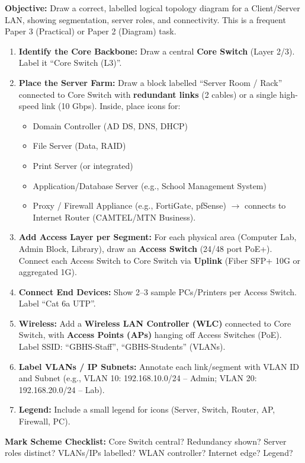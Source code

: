 \documentclass[11pt]{article}
\begin{document}
\begin{methode}
\textbf{Objective:} Draw a correct, labelled logical topology diagram for a Client/Server LAN, showing segmentation, server roles, and connectivity. This is a frequent Paper 3 (Practical) or Paper 2 (Diagram) task.

\begin{enumerate}
    \item \textbf{Identify the Core Backbone:} Draw a central \textbf{Core Switch} (Layer 2/3). Label it ``Core Switch (L3)''.
    \item \textbf{Place the Server Farm:} Draw a block labelled ``Server Room / Rack'' connected to Core Switch with \textbf{redundant links} (2 cables) or a single high-speed link (10 Gbps). Inside, place icons for:
    \begin{itemize}
        \item Domain Controller (AD DS, DNS, DHCP)
        \item File Server (Data, RAID)
        \item Print Server (or integrated)
        \item Application/Database Server (e.g., School Management System)
        \item Proxy / Firewall Appliance (e.g., FortiGate, pfSense) $\rightarrow$ connects to Internet Router (CAMTEL/MTN Business).
    \end{itemize}
    \item \textbf{Add Access Layer per Segment:} For each physical area (Computer Lab, Admin Block, Library), draw an \textbf{Access Switch} (24/48 port PoE+). Connect each Access Switch to Core Switch via \textbf{Uplink} (Fiber SFP+ 10G or aggregated 1G).
    \item \textbf{Connect End Devices:} Show 2--3 sample PCs/Printers per Access Switch. Label ``Cat 6a UTP''.
    \item \textbf{Wireless:} Add a \textbf{Wireless LAN Controller (WLC)} connected to Core Switch, with \textbf{Access Points (APs)} hanging off Access Switches (PoE). Label SSID: ``GBHS-Staff'', ``GBHS-Students'' (VLANs).
    \item \textbf{Label VLANs / IP Subnets:} Annotate each link/segment with VLAN ID and Subnet (e.g., VLAN 10: 192.168.10.0/24 -- Admin; VLAN 20: 192.168.20.0/24 -- Lab).
    \item \textbf{Legend:} Include a small legend for icons (Server, Switch, Router, AP, Firewall, PC).
\end{enumerate}
\textbf{Mark Scheme Checklist:} Core Switch central? Redundancy shown? Server roles distinct? VLANs/IPs labelled? WLAN controller? Internet edge? Legend?
\end{methode}
\end{document}

